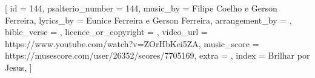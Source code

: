 
[
    id                     = {144},
    psalterio_number       = {144},
    music_by               = {Filipe Coelho e Gerson Ferreira},
    lyrics_by              = {Eunice Ferreira e Gerson Ferreira},
    arrangement_by         = {},
    bible_verse            = {},
    licence_or_copyright   = {},
    video_url              = {https://www.youtube.com/watch?v=ZOrHbKei5ZA},
    music_score            = {https://musescore.com/user/26352/scores/7705169},
    extra                  = {},
    index                  = {Brilhar por Jesus},
]


